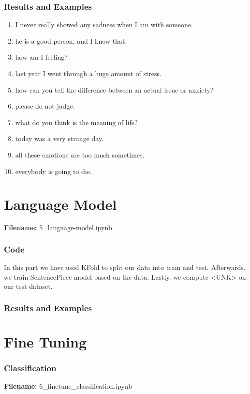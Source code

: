 \documentclass[12pt, a4paper]{article}
\begin{document}
\section*{Results and Examples}
\begin{enumerate}
	\item I never really showed any sadness when I am with someone.
	\item he is a good person, and I know that.
	\item how am I feeling?
	\item last year I went through a huge amount of stress.
	\item how can you tell the difference between an actual issue or anxiety?
	\item please do not judge.
	\item what do you think is the meaning of life?
	\item today was a very strange day.
	\item all these emotions are too much sometimes. 
	\item everybody is going to die.
\end{enumerate}

\newpage
\part{Language Model}
\large{\textbf{Filename:} 5\_language-model.ipynb}

\section*{Code}
In this part we have used KFold to split our data into train and test. Afterwards, we train SentencePiece model based on the data. Lastly, we compute <UNK> on our test dataset. 

\section*{Results and Examples}



\newpage
\part{Fine Tuning}

\section*{Classification}
\large{\textbf{Filename:} 6\_finetune\_classification.ipynb}
\end{document}
